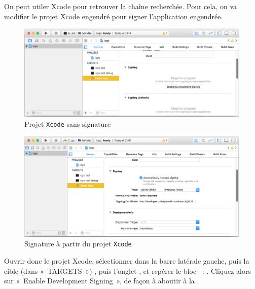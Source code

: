 
On peut utiler Xcode pour retrouver la chaîne recherchée. Pour cela, on va modifier le projet Xcode engendré pour signer l'application engendrée. 





\begin{figure}[!t]
  \centering
  \includegraphics[width=15cm]{chapitre-cocoa-features/projet-xcode-sans-signature.png}
  \caption{Projet \texttt{Xcode} sans signature}
\end{figure}


\begin{figure}[!t]
  \centering
  \includegraphics[width=15cm]{chapitre-cocoa-features/projet-xcode-avec-signature.png}
  \caption{Signature à partir du projet \texttt{Xcode}}
\end{figure}

Ouvrir donc le projet Xcode, sélectionner  dans la barre latérale gauche, puis la cible (dans «~TARGETS~») , puis l'onglet , et repérer le bloc ~: . Cliquez alors sur «~Enable Development Signing~», de façon à aboutir à la . 

